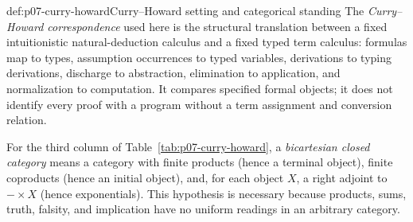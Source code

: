\begin{hbdefinition}{def:p07-curry-howard}{Curry--Howard setting and categorical standing}
The \emph{Curry--Howard correspondence} used here is the structural
translation between a fixed intuitionistic natural-deduction calculus and a
fixed typed term calculus: formulas map to types, assumption occurrences to
typed variables, derivations to typing derivations, discharge to abstraction,
elimination to application, and normalization to computation.  It compares
specified formal objects; it does not identify every proof with a program
without a term assignment and conversion relation.

For the third column of Table~\ref{tab:p07-curry-howard}, a
\emph{bicartesian closed category} means a category with finite products
(hence a terminal object), finite coproducts (hence an initial object), and,
for each object \(X\), a right adjoint to \(-\times X\) (hence
exponentials).  This hypothesis is necessary because products, sums, truth,
falsity, and implication have no uniform readings in an arbitrary category.


\end{hbdefinition}
